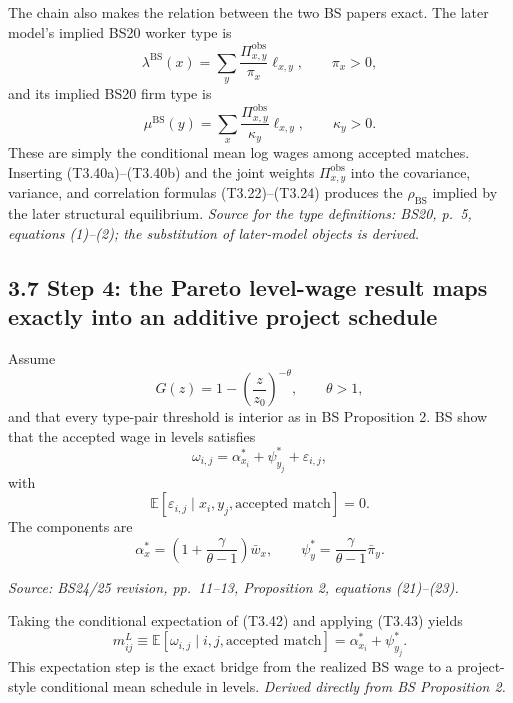 \documentclass[11pt]{article}
\begin{document}
The chain also makes the relation between the two BS papers exact.  The later
model's implied BS20 worker type is
\[
\lambda^{\mathrm{BS}}(x)
=
\sum_y
\frac{\Pi^{\mathrm{obs}}_{x,y}}{\pi_x}
\ell_{x,y},
\qquad \pi_x>0,
\tag{T3.40a}
\]
and its implied BS20 firm type is
\[
\mu^{\mathrm{BS}}(y)
=
\sum_x
\frac{\Pi^{\mathrm{obs}}_{x,y}}{\kappa_y}
\ell_{x,y},
\qquad \kappa_y>0.
\tag{T3.40b}
\]
These are simply the conditional mean log wages among accepted matches.
Inserting (T3.40a)--(T3.40b) and the joint weights
\(\Pi^{\mathrm{obs}}_{x,y}\) into the covariance, variance, and correlation
formulas (T3.22)--(T3.24) produces the
\(\rho_{\mathrm{BS}}\) implied by the later structural equilibrium.
\textit{Source for the type definitions: BS20, p.\ 5, equations (1)--(2);
the substitution of later-model objects is derived.}

\subsection{3.7 Step 4: the Pareto level-wage result maps exactly into an additive project schedule}

Assume
\[
G(z)=1-\left(\frac{z}{z_0}\right)^{-\theta},
\qquad
\theta>1,
\tag{T3.41}
\]
and that every type-pair threshold is interior as in BS Proposition 2.  BS
show that the accepted wage in levels satisfies
\[
\omega_{i,j}
=
\alpha^*_{x_i}+\psi^*_{y_j}+\varepsilon_{i,j},
\tag{T3.42}
\]
with
\[
\mathbb E[
\varepsilon_{i,j}\mid x_i,y_j,\text{accepted match}
]=0.
\tag{T3.43}
\]
The components are
\[
\alpha_x^*
=
\left(1+\frac{\gamma}{\theta-1}\right)\bar w_x,
\qquad
\psi_y^*
=
\frac{\gamma}{\theta-1}\bar\pi_y.
\tag{T3.44}
\]

\textit{Source: BS24/25 revision, pp.\ 11--13, Proposition 2,
equations (21)--(23).}

Taking the conditional expectation of (T3.42) and applying (T3.43) yields
\[
m^L_{ij}
\equiv
\mathbb E[
\omega_{i,j}\mid i,j,\text{accepted match}
]
=
\alpha^*_{x_i}+\psi^*_{y_j}.
\tag{T3.45}
\]
This expectation step is the exact bridge from the realized BS wage to a
project-style conditional mean schedule in levels.
\textit{Derived directly from BS Proposition 2.}
\end{document}

